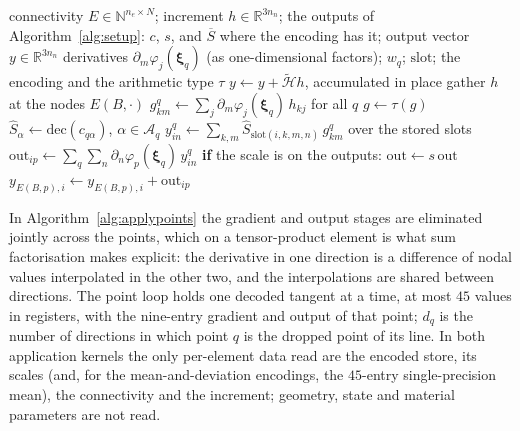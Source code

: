 \documentclass[sigconf,balance=false]{acmart}
\newcommand{\R}{\mathbb{R}}
\newcommand{\xhat}{\boldsymbol{\xi}}
\newcommand{\Sbar}{\overline{S}}
\begin{document}
\begin{algorithm*}[t]
\caption{Application, per-point schedule (HEX8)}
\label{alg:applypoints}
\begin{algorithmic}[1]
\Require connectivity $E\in\mathbb{N}^{n_e\times N}$; increment $h\in\R^{3n_n}$; the outputs of
  Algorithm~\ref{alg:setup}: $c$, $s$, and $\Sbar$ where the encoding has it; output vector
  $y\in\R^{3n_n}$
\Constants derivatives $\partial_m\varphi_j(\xhat_q)$ (as one-dimensional factors); $w_q$;
  $\mathrm{slot}$; the encoding and the arithmetic type $\tau$
\Ensure $y \gets y + \widetilde{\mathcal{H}}h$, accumulated in place
  \State gather $h$ at the nodes $E(B,\cdot)$ 
  \State $g^q_{km} \gets \sum_j \partial_m\varphi_j(\xhat_q)\, h_{kj}$ for all $q$
  \State $g \gets \tau(g)$
    \State $\widehat S_\alpha \gets \mathrm{dec}(c_{q\alpha})$, $\alpha\in\mathcal{A}_q$
    \State $y^q_{in} \gets \sum_{k,m} \widehat S_{\mathrm{slot}(i,k,m,n)}\, g^q_{km}$ over the stored slots
  \EndFor
  \State $\mathrm{out}_{ip} \gets \sum_q \sum_n \partial_n\varphi_p(\xhat_q)\, y^q_{in}$
  \State \textbf{if} the scale is on the outputs: $\mathrm{out} \gets s\,\mathrm{out}$
  \State $y_{E(B,p),i} \gets y_{E(B,p),i} + \mathrm{out}_{ip}$ 
\EndFor
\end{algorithmic}
\end{algorithm*}

In Algorithm~\ref{alg:applypoints} the gradient and output stages are eliminated jointly across
the points, which on a tensor-product element is what sum factorisation makes explicit: the
derivative in one direction is a difference of nodal values interpolated in the other two, and the
interpolations are shared between directions.  The point loop holds one decoded tangent at a time,
at most $45$ values in registers, with the nine-entry gradient and output of that point; $d_q$ is
the number of directions in which point $q$ is the dropped point of its line.  In both
application kernels the only per-element data read are the encoded store, its scales (and, for the
mean-and-deviation encodings, the $45$-entry single-precision mean), the
connectivity and the increment; geometry, state and material parameters are not read.
\end{document}
